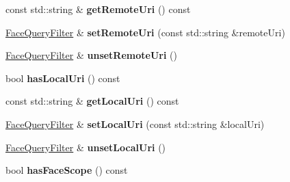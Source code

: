 \begin{DoxyCompactItemize}
\item 
const std\+::string \& {\bfseries get\+Remote\+Uri} () const\hypertarget{classndn_1_1nfd_1_1FaceQueryFilter_afacceb8c65327a47e549d2215c55799f}{}\label{classndn_1_1nfd_1_1FaceQueryFilter_afacceb8c65327a47e549d2215c55799f}

\item 
\hyperlink{classndn_1_1nfd_1_1FaceQueryFilter}{Face\+Query\+Filter} \& {\bfseries set\+Remote\+Uri} (const std\+::string \&remote\+Uri)\hypertarget{classndn_1_1nfd_1_1FaceQueryFilter_a42a230dbff9c8266fdc015f8e78078f6}{}\label{classndn_1_1nfd_1_1FaceQueryFilter_a42a230dbff9c8266fdc015f8e78078f6}

\item 
\hyperlink{classndn_1_1nfd_1_1FaceQueryFilter}{Face\+Query\+Filter} \& {\bfseries unset\+Remote\+Uri} ()\hypertarget{classndn_1_1nfd_1_1FaceQueryFilter_a260a2fe53068b8eb17d4c2bbcf5c2060}{}\label{classndn_1_1nfd_1_1FaceQueryFilter_a260a2fe53068b8eb17d4c2bbcf5c2060}

\item 
bool {\bfseries has\+Local\+Uri} () const\hypertarget{classndn_1_1nfd_1_1FaceQueryFilter_ae8c62456f777e600ace440aca41e4ada}{}\label{classndn_1_1nfd_1_1FaceQueryFilter_ae8c62456f777e600ace440aca41e4ada}

\item 
const std\+::string \& {\bfseries get\+Local\+Uri} () const\hypertarget{classndn_1_1nfd_1_1FaceQueryFilter_a0a9e778a35cdb8fc2d726481f2a8069d}{}\label{classndn_1_1nfd_1_1FaceQueryFilter_a0a9e778a35cdb8fc2d726481f2a8069d}

\item 
\hyperlink{classndn_1_1nfd_1_1FaceQueryFilter}{Face\+Query\+Filter} \& {\bfseries set\+Local\+Uri} (const std\+::string \&local\+Uri)\hypertarget{classndn_1_1nfd_1_1FaceQueryFilter_aba8b7d615078b56b6a00a45a2b6e4b06}{}\label{classndn_1_1nfd_1_1FaceQueryFilter_aba8b7d615078b56b6a00a45a2b6e4b06}

\item 
\hyperlink{classndn_1_1nfd_1_1FaceQueryFilter}{Face\+Query\+Filter} \& {\bfseries unset\+Local\+Uri} ()\hypertarget{classndn_1_1nfd_1_1FaceQueryFilter_ad2fb8e8b910504c7868a032fe74f5f85}{}\label{classndn_1_1nfd_1_1FaceQueryFilter_ad2fb8e8b910504c7868a032fe74f5f85}

\item 
bool {\bfseries has\+Face\+Scope} () const\hypertarget{classndn_1_1nfd_1_1FaceQueryFilter_af11988566fbb276d77a3e8ad839a8146}{}\label{classndn_1_1nfd_1_1FaceQueryFilter_af11988566fbb276d77a3e8ad839a8146}


\end{DoxyCompactItemize}
